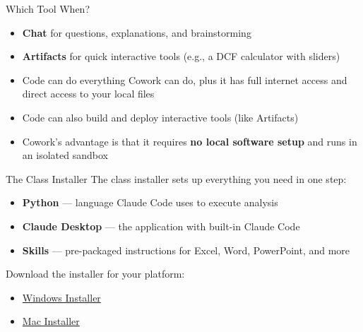 \documentclass[aspectratio=169]{beamer}
\begin{document}
\begin{frame}{Which Tool When?}
\begin{itemize}
  \item \textbf{Chat} for questions, explanations, and brainstorming
  \item \textbf{Artifacts} for quick interactive tools (e.g., a DCF calculator with sliders)
  \item Code can do everything Cowork can do, plus it has \alert{full internet access} and direct access to your local files
  \item Code can also build and deploy interactive tools (like Artifacts)
  \item Cowork's advantage is that it requires \textbf{no local software setup} and runs in an isolated sandbox
\end{itemize}
\end{frame}

\begin{frame}{The Class Installer}
The class installer sets up everything you need in one step:
\vspace{0.3cm}
\begin{itemize}
  \item \textbf{Python} --- language Claude Code uses to execute analysis
  \item \textbf{Claude Desktop} --- the application with built-in Claude Code
  \item \textbf{Skills} --- pre-packaged instructions for Excel, Word, PowerPoint, and more
\end{itemize}
\vspace{0.3cm}
Download the installer for your platform:
\begin{itemize}
  \item \href{https://mgmt675.kerryback.com/install/windows/windows-install.zip}{Windows Installer}
  \item \href{https://mgmt675.kerryback.com/install/mac/install.sh}{Mac Installer}
\end{itemize}
\end{frame}
\end{document}
